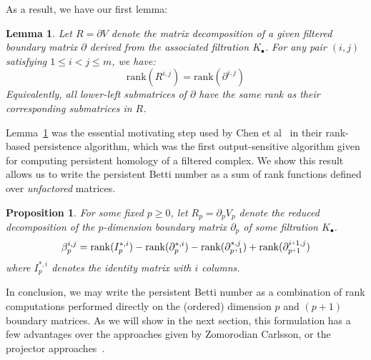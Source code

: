 \documentclass[10pt]{article}
\newcommand{\+}{%
	\raisebox{0.18ex}{\scaleobj{0.55}{+}}
}
\newtheorem{proposition}{Proposition}
\newtheorem{lemma}{Lemma}
\begin{document}
As a result, we have our first lemma: 
\begin{lemma}\label{lemma:rank}
Let $R = \partial V$ denote the matrix decomposition of a given filtered boundary matrix $\partial$ derived from the associated filtration $K_\bullet$. For any pair $(i,j)$ satisfying $1 \leq i < j \leq m$, we have:
	\begin{equation}\label{eq:lower_left_rank}
		\mathrm{rank}(R^{i,j}) = \mathrm{rank}(\partial^{i, j})
	\end{equation}
Equivalently, all lower-left submatrices of $\partial$ have the same rank as their corresponding submatrices in $R$. 
\end{lemma}
Lemma~\ref{lemma:rank} was the essential motivating step used by Chen et al~\cite{} in their rank-based persistence algorithm, which was the first output-sensitive algorithm given for computing persistent homology of a filtered complex. We show this result allows us to write the persistent Betti number as a sum of rank functions defined over \emph{unfactored} matrices. 
\begin{proposition}
For some fixed $p \geq 0$, let $R_p = \partial_p V_p$ denote the reduced decomposition of the $p$-dimension boundary matrix $\partial_p$ of some filtration $K_\bullet$.  
	\begin{equation}\label{eq:betti_four}
	\beta_p^{i,j} = \mathrm{rank}(I_p^{\ast,i}) - \mathrm{rank}(\partial_p^{\ast,i}) - \mathrm{rank}(\partial_{p\+1 }^{\ast,j}) + \mathrm{rank}(\partial_{p\+1}^{i \+ 1, j} )
	\end{equation}
where $I_p^{\ast,i}$ denotes the identity matrix with $i$ columns.
\end{proposition}
\noindent In conclusion, we may write the persistent Betti number as a combination of rank computations performed directly on the (ordered) dimension $p$ and $(p+1)$ boundary matrices. As we will show in the next section, this formulation has a few advantages over the approaches given by Zomorodian Carlsson, or the projector approaches~\cite{}. 
\end{document}
